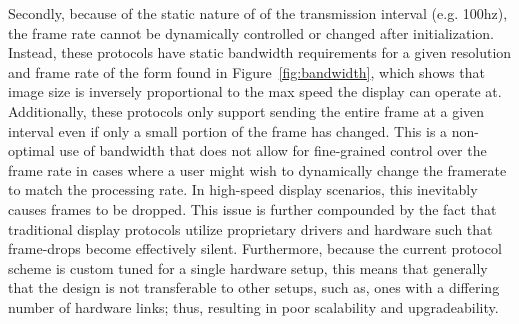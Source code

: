 Secondly, because of the static nature of of the transmission interval (e.g. 100hz), the frame rate cannot be dynamically controlled or changed after initialization. Instead, these protocols have static bandwidth requirements for a given resolution and frame rate of the form found in Figure~\ref{fig:bandwidth}, which shows that image size is inversely proportional to the max speed the display can operate at. Additionally, these protocols only support sending the entire frame at a given interval even if only a small portion of the frame has changed. This is a non-optimal use of bandwidth that does not allow for fine-grained control over the frame rate in cases where a user might wish to dynamically change the framerate to match the processing rate. In high-speed display scenarios, this inevitably causes frames to be dropped. This issue is further compounded by the fact that traditional display protocols utilize proprietary drivers and hardware such that frame-drops become effectively silent.  Furthermore, because the current protocol scheme is custom tuned for a single hardware setup, this means that generally that the design is not transferable to other setups, such as, ones with a differing number of hardware links; thus, resulting in poor scalability and upgradeability.


